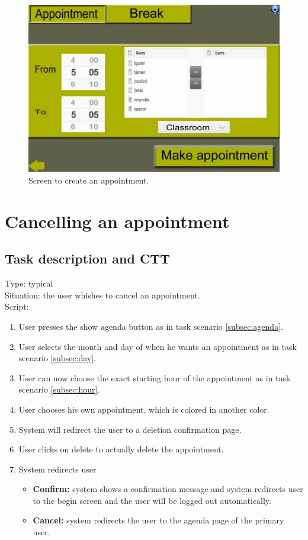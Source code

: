 \documentclass[11pt, a4paper,svglistings]{report}
\begin{document}
\begin{figure}[H]
\centering
    \includegraphics[width=1\textwidth]{Appointment.jpg}
  \caption[Appointment screen]{\label{fig:Appointment}Screen to create an appointment.}
\end{figure}


\section{Cancelling an appointment}

\subsection{Task description and CTT}

Type: typical \\
Situation: the user whishes to cancel an appointment. \\
Script:
\begin{enumerate}
\item User presses the show agenda button as in task scenario \ref{subsec:agenda}.
\item User selects the month and day of when he wants an appointment as in task scenario \ref{subsec:day}.
\item User can now choose the exact starting hour of the appointment as in task scenario \ref{subsec:hour}.
\item User chooses his own appointment, which is colored in another color.
\item System will redirect the user to a deletion confirmation page.
\item User clicks on delete to actually delete the appointment.
\item System redirects user
\begin{itemize}
\item \textbf{Confirm:} system shows a confirmation message and system redirects user to the begin screen and the user will be logged out automatically.
\item \textbf{Cancel:} system redirects the user to the agenda page of the primary user.
\end{itemize}
\end{enumerate}
\end{document}
